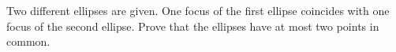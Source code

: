 Two different ellipses are given. One focus of the first ellipse coincides with one focus of the second ellipse. Prove that the ellipses have at most two points in common.